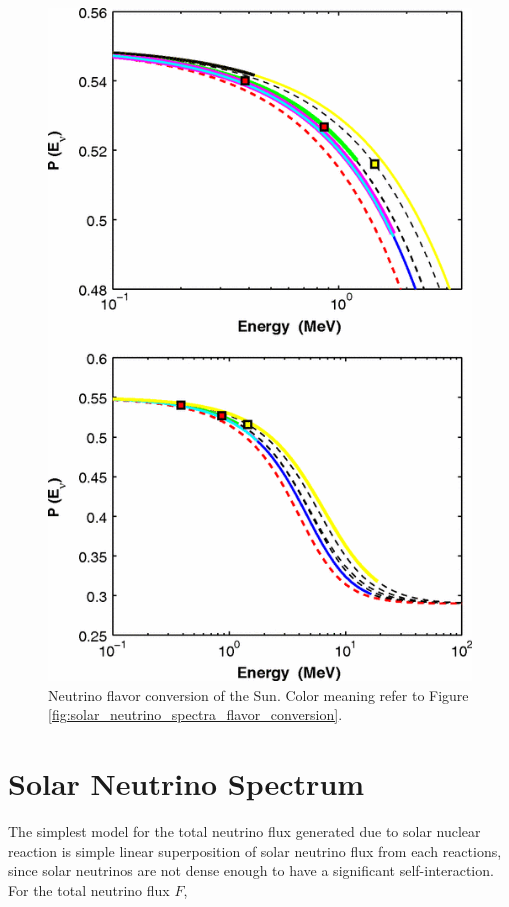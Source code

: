 \documentclass[%
 aip,
 jmp,%
 amsmath,amssymb,
 reprint,%
]{revtex4-1}
\begin{document}
\begin{figure}
\centering
\includegraphics[width=\columnwidth]{assets/solar_neutrino_flavor_conversion.png}
\caption{Neutrino flavor conversion of the Sun. Color meaning refer to Figure \ref{fig:solar_neutrino_spectra_flavor_conversion}.\cite{Lopes2013} }
\label{fig:solar_neutrino_flavor_conversion}
\end{figure}



\section{Solar Neutrino Spectrum}


The simplest model for the total neutrino flux generated due to solar nuclear reaction is simple linear superposition of solar neutrino flux from each reactions, since solar neutrinos are not dense enough to have a significant self-interaction. For the total neutrino flux $F$,
\end{document}
